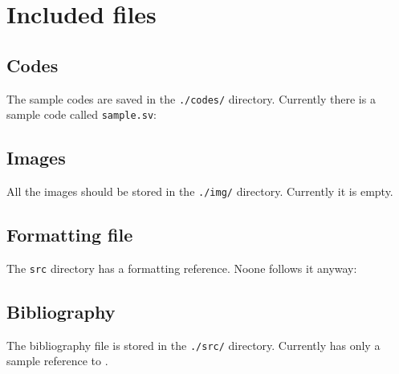         
        \section {Included files}
        \label{sec:files}
        
        \subsection {Codes}
        \label{sec:files:codes}
        The sample codes are saved in the \verb+./codes/+ directory. Currently there is 
        a sample code called \verb+sample.sv+:
        

        \subsection {Images}
        \label{sec:files:images}
        All the images should be stored in the \verb+./img/+ directory. Currently it is
        empty.

        \subsection {Formatting file}
        \label{sec:files:formatting}
        The \verb+src+ directory has a formatting reference. Noone follows it anyway:
        

        \subsection {Bibliography}
        \label{sec:files:bibliography}
        The bibliography file is stored in the \verb+./src/+ directory. Currently has only
        a sample reference to \cite{test}.
        
        
        
        

